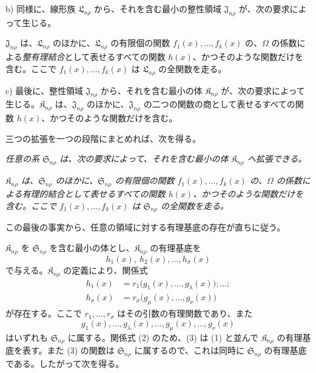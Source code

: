 \documentclass[11pt]{jlreq}
\providecommand{\Kfield}{\mathfrak{K}}
\providecommand{\Ssys}{\mathfrak{S}}
\providecommand{\Lsys}{\mathfrak{L}}
\providecommand{\Jdom}{\mathfrak{J}}
\begin{document}
b) 同様に、線形族 $\Lsys_{n\rho}$ から、それを含む最小の整性領域 $\Jdom_{n\rho}$ が、次の要求によって生じる。

$\Jdom_{n\rho}$ は、$\Lsys_{n\rho}$ のほかに、$\Lsys_{n\rho}$ の有限個の関数 $f_1(x),\ldots,f_k(x)$ の、$\Omega$ の係数による\emph{整有理結合}として表せるすべての関数 $h(x)$、かつそのような関数だけを含む。ここで $f_1(x),\ldots,f_k(x)$ は $\Lsys_{n\rho}$ の全関数を走る。

c) 最後に、整性領域 $\Jdom_{n\rho}$ から、それを含む最小の体 $\Kfield_{n\rho}$ が、次の要求によって生じる。$\Kfield_{n\rho}$ は、$\Jdom_{n\rho}$ のほかに、$\Jdom_{n\rho}$ の二つの関数の商として表せるすべての関数 $h(x)$、かつそのような関数だけを含む。

三つの拡張を一つの段階にまとめれば、次を得る。

\emph{任意の系 $\Ssys_{n\rho}$ は、次の要求によって、それを含む最小の体 $\Kfield_{n\rho}$ へ拡張できる。}

\emph{$\Kfield_{n\rho}$ は、$\Ssys_{n\rho}$ のほかに、$\Ssys_{n\rho}$ の有限個の関数 $f_1(x),\ldots,f_k(x)$ の、$\Omega$ の係数による有理的結合として表せるすべての関数 $h(x)$、かつそのような関数だけを含む。ここで $f_1(x),\ldots,f_k(x)$ は $\Ssys_{n\rho}$ の全関数を走る。}

この最後の事実から、任意の領域に対する有理基底の存在が直ちに従う。

$\Kfield_{n\rho}$ を $\Ssys_{n\rho}$ を含む最小の体とし、$\Kfield_{n\rho}$ の有理基底を
\begin{equation}
  h_1(x),\ h_2(x),\ldots,h_\sigma(x)
\tag{1}
\end{equation}
で与える。$\Kfield_{n\rho}$ の定義により、関係式
\begin{equation}
\begin{aligned}
 h_1(x)&=r_1\bigl(g_1(x),\ldots,g_\lambda(x)\bigr);\ldots;\\
 h_\sigma(x)&=r_\sigma\bigl(g_\mu(x),\ldots,g_\nu(x)\bigr)
\end{aligned}
\tag{2}
\end{equation}
が存在する。ここで $r_1,\ldots,r_\sigma$ はその引数の有理関数であり、また
\begin{equation}
  g_1(x),\ldots,g_\lambda(x),\ldots,
  g_\mu(x),\ldots,g_\nu(x)
\tag{3}
\end{equation}
はいずれも $\Ssys_{n\rho}$ に属する。関係式 (2) のため、(3) は (1) と並んで $\Kfield_{n\rho}$ の有理基底を表す。また (3) の関数は $\Ssys_{n\rho}$ に属するので、これは同時に $\Ssys_{n\rho}$ の有理基底である。したがって次を得る。
\end{document}
